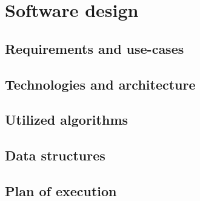 \chapter{Software design}

\section{Requirements and use-cases}

\section{Technologies and architecture}

\section{Utilized algorithms}

\section{Data structures}

\section{Plan of execution}